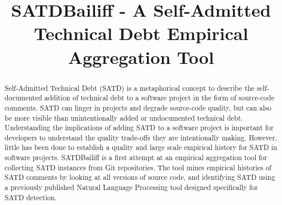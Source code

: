 \documentclass[conference]{IEEEtran}
\begin{document}
\usetikzlibrary{calc,trees,positioning,arrows,chains,shapes.geometric,%
    decorations.pathreplacing,decorations.pathmorphing,shapes,%
    matrix,shapes.symbols}


\title{SATDBailiff - A Self-Admitted Technical Debt Empirical Aggregation Tool\\}

\author{
}

\maketitle

\begin{abstract}
Self-Admitted Technical Debt (SATD) is a metaphorical concept to describe the self-documented addition of technical debt to a software project in the form of source-code comments.
SATD can linger in projects and degrade source-code quality, but can also be more visible than unintentionally added or undocumented technical debt.
Understanding the implications of adding SATD to a software project is important for developers to understand the quality trade-offs they are intentionally making.
However, little has been done to establish a quality and large scale empirical history for SATD in software projects.
SATDBailiff is a first attempt at an empirical aggregation tool for collecting SATD instances from Git repositories.
The tool mines empirical histories of SATD comments by looking at all versions of source code, and identifying SATD using a previously published Natural Language Processing tool designed specifically for SATD detection.
\end{abstract}
\end{document}
